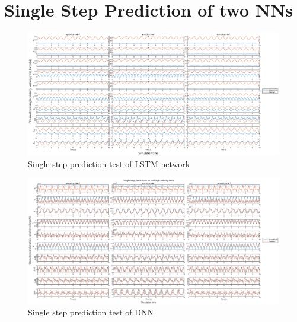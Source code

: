 \section{Single Step Prediction of two NNs}
\begin{figure}[htb]
    \centering
    \includegraphics[width=\linewidth]{img/AppA/lstm_pred.eps}
    \caption{Single step prediction test of LSTM network}
    \label{fig:lstm_test}
\end{figure}

\begin{figure}[htb]
    \centering
    \includegraphics[width=\linewidth]{img/AppA/model_all.eps}
    \caption{Single step prediction test of DNN}
    \label{fig:DNN_test}
\end{figure}
\newpage
